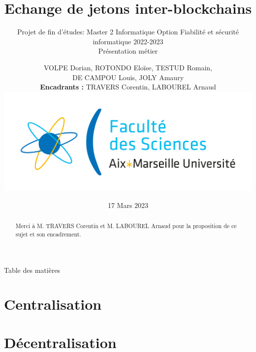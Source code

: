 \documentclass{beamer}
\title[Swap Cross-Blockchain]{Echange de jetons inter-blockchains}
\subtitle{Projet de fin d'études: Master 2 Informatique Option Fiabilité et sécurité informatique 2022-2023 \\ Présentation métier}
\author[M2 FSI]{VOLPE Dorian, ROTONDO Eloïse, TESTUD Romain,\\DE CAMPOU Louis, JOLY Amaury  \\ \textbf{Encadrants :} TRAVERS Corentin, LABOUREL Arnaud \\[2ex] \includegraphics[scale=0.1]{./img/amu.png}}
\institute[Aix-Marseille Université]{M2 Fiabilité et sécurité informatique}
\date{17 Mars 2023}
\newenvironment*{remerciements}{%
  \renewcommand*{\abstractname}{Remerciements}
  \begin{abstract}
}{
  \end{abstract}
}
\begin{document}
\maketitle

\begin{frame}
  \begin{remerciements}
    Merci à M. TRAVERS Corentin et M. LABOUREL Arnaud pour la proposition de ce sujet et son encadrement.
  \end{remerciements}
\end{frame}

\begin{frame}{Table des matières}
  \tableofcontents
\end{frame}

\section{Centralisation}

\section{Décentralisation}

\end{document}
